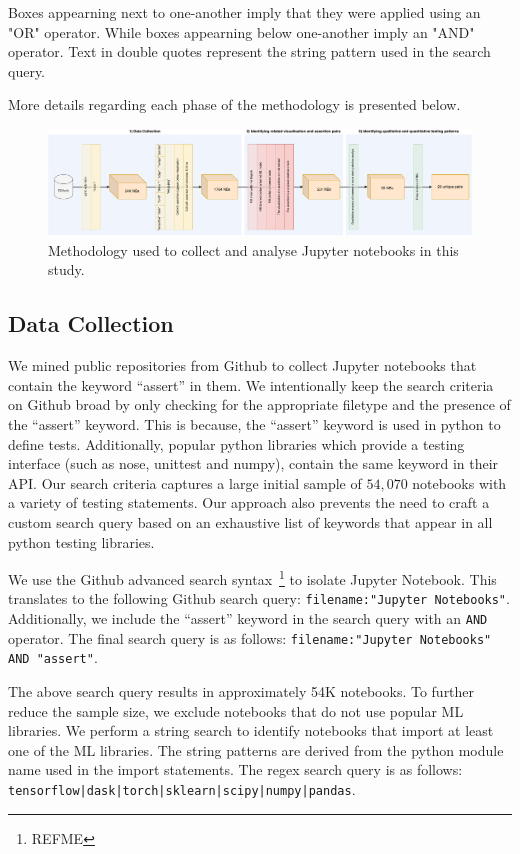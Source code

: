 \documentclass[acmsmall,screen,review,anonymous]{acmart}
\begin{document}
Boxes appearning next to one-another imply that they were applied using an "OR" operator. While boxes appearning below one-another imply an "AND" operator. Text in double quotes represent the string pattern used in the search query.

More details regarding each phase of the methodology is presented below.

\begin{figure}
  \centering
  \includegraphics[width=\textwidth]{method.pdf}
  \caption{Methodology used to collect and analyse Jupyter notebooks
    in this study.}
  \label{fig:method}
\end{figure}

\subsection{Data Collection}\label{sec:data-collect}

We mined public repositories from Github to collect Jupyter notebooks that contain the keyword ``assert'' in them. We intentionally keep the search criteria on Github broad by only checking for the appropriate filetype and the presence of the ``assert'' keyword. This is because, the ``assert'' keyword is used in python to define tests. Additionally, popular python libraries which provide a testing interface (such as nose, unittest and numpy), contain the same keyword in their API. Our search criteria captures a large initial sample of $54,070$ notebooks with a variety of testing statements. Our approach also prevents the need to craft a custom search query based on an exhaustive list of keywords that appear in all python testing libraries.

We use the Github advanced search syntax~\footnote{REFME} to isolate Jupyter Notebook. This translates to the following Github search query: \texttt{filename:"Jupyter Notebooks"}. Additionally, we include the ``assert'' keyword in the search query with an \texttt{AND} operator. The final search query is as follows: \texttt{filename:"Jupyter Notebooks" AND "assert"}.

The above search query results in approximately 54K notebooks. To further reduce the sample size, we exclude notebooks that do not use popular ML libraries. We perform a string search to identify notebooks that import at least one of the ML libraries. The string patterns are derived from the python module name used in the import statements. The regex search query is as follows: \texttt{tensorflow|dask|torch|sklearn|scipy|numpy|pandas}.
\end{document}
